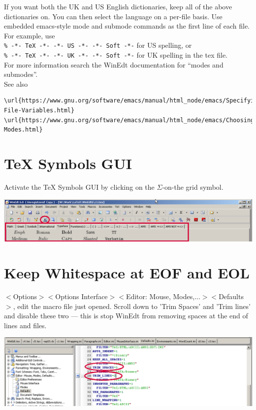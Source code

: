 If you want both the UK and US English dictionaries, keep all of the above dictionaries on. You can then select the language on a per-file basis.
Use embedded emacs-style mode and submode commands as the first line of each file. For example, use\\
\verb"% -*- TeX -*- -*- US -*- -*- Soft -*-" for US spelling, or\\
\verb"% -*- TeX -*- -*- UK -*- -*- Soft -*-" for UK spelling in the tex file.\\
For more information search the WinEdt documentation for ``modes and submodes''.\\
See also
\begin{lstlisting}
\url{https://www.gnu.org/software/emacs/manual/html_node/emacs/Specifying-File-Variables.html}
\url{https://www.gnu.org/software/emacs/manual/html_node/emacs/Choosing-Modes.html}
\end{lstlisting}


\section{TeX Symbols GUI}

Activate the TeX Symbols GUI by clicking on the $\Sigma$-on-the grid symbol.

\centerline{\includegraphics[bb= 0 0 1037 179,width=\textwidth]{eps/texsymbolsgiu.png}}



\section{Keep Whitespace at EOF and EOL}

$<$Options$>$$<$Options Interface$>$$<$Editor: Mouse, Modes,...$>$$<$Defaults$>$, edit the macro file just opened. Scroll down to 'Trim Spaces' and 'Trim lines' and disable these two --- this is stop WinEdt from removing spaces at the end of lines and files.

\centerline{\includegraphics[bb= 0 0 1037 288,width=\textwidth]{eps/trimeoleof.png}}


